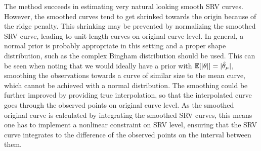 The method succeeds in estimating very natural looking smooth SRV curves.
However, the smoothed curves tend to get shrinked towards the origin because of the ridge penalty.
This shrinking may be prevented by normalizing the smoothed SRV curve, leading to unit-length curves on original curve level.
In general, a normal prior is probably appropriate in this setting and a proper shape distribution, such as the complex Bingham distribution \parencite[see e.g.][Chap.\ 10]{DrydenMardia2016} should be used.
This can be seen when noting that we would ideally have a prior with $\mathbb{E}[\lvert\theta\rvert] = \lvert\hat\theta_\mu\rvert$, smoothing the observations towards a curve of similar size to the mean curve, which cannot be achieved with a normal distribution.
The smoothing could be further improved by providing true interpolation, so that the interpolated curve goes through the observed points on original curve level.
As the smoothed original curve is calculated by integrating the smoothed SRV curves, this means one has to implement a nonlinear constraint on SRV level, ensuring that the SRV curve integrates to the difference of the observed points on the interval between them.


